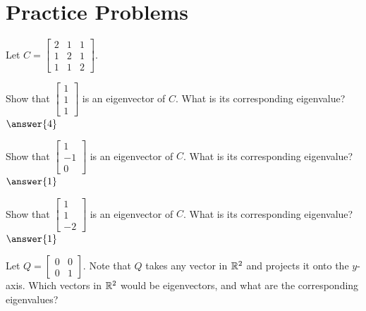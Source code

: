 \documentclass{ximera}
\begin{document}
\section*{Practice Problems}


\begin{problem}\label{prob:checkeig1}
Let $C=\begin{bmatrix} 2 & 1 & 1\\ 1 & 2 & 1\\ 1 & 1 & 2\end{bmatrix}$.  

\begin{question}
Show that $\begin{bmatrix} 1\\1\\1 \end{bmatrix}$ is an eigenvector of $C$.  What is its corresponding eigenvalue?
$\answer{4}$
\end{question}

 \begin{question}
Show that $\begin{bmatrix} 1\\-1\\0 \end{bmatrix}$ is an eigenvector of $C$.  What is its corresponding eigenvalue?
$\answer{1}$
\end{question}

 \begin{question}
Show that $\begin{bmatrix} 1\\1\\-2 \end{bmatrix}$ is an eigenvector of $C$.  What is its corresponding eigenvalue?
$\answer{1}$
\end{question}
\end{problem}


\begin{problem}\label{prob:eigprojmatrix} 
Let $Q=\begin{bmatrix} 0& 0\\ 0&1\end{bmatrix}$.  Note that $Q$ takes any vector in $\mathbb{R}^2$ and projects it onto the $y$-axis.  Which vectors in $\mathbb{R}^2$ would be eigenvectors, and what are the corresponding eigenvalues?
\end{problem}
\end{document}
